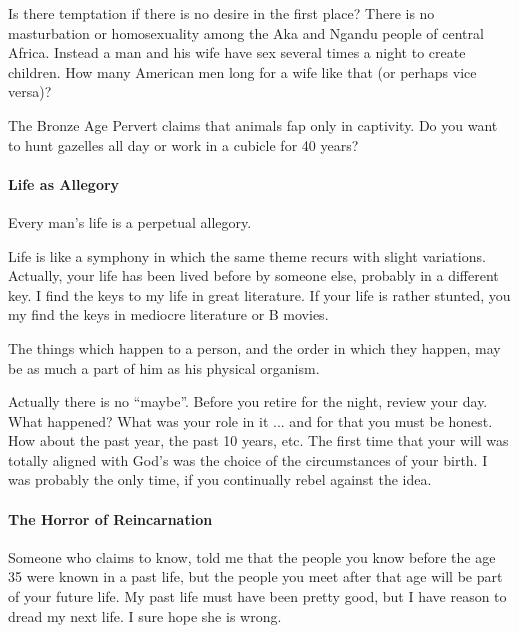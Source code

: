 Is there temptation if there is no desire in the first place? There is no masturbation or homosexuality among the Aka and Ngandu people of central Africa. Instead a man and his wife have sex several times a night to create children. How many American men long for a wife like that (or perhaps vice versa)?

The Bronze Age Pervert claims that animals fap only in captivity. Do you want to hunt gazelles all day or work in a cubicle for 40 years?

\paragraph{Life as Allegory}


\begin{quotex}
Every man's life is a perpetual allegory.
\end{quotex}


Life is like a symphony in which the same theme recurs with slight variations. Actually, your life has been lived before by someone else, probably in a different key. I find the keys to my life in great literature. If your life is rather stunted, you my find the keys in mediocre literature or B movies.

\begin{quotex}
The things which happen to a person, and the order in which they happen, may be as much a part of him as his physical organism.
\end{quotex}


Actually there is no ``maybe''. Before you retire for the night, review your day. What happened? What was your role in it ... and for that you must be honest. How about the past year, the past 10 years, etc. The first time that your will was totally aligned with God's was the choice of the circumstances of your birth. I was probably the only time, if you continually rebel against the idea.

\paragraph{The Horror of Reincarnation}


Someone who claims to know, told me that the people you know before the age 35 were known in a past life, but the people you meet after that age will be part of your future life. My past life must have been pretty good, but I have reason to dread my next life. I sure hope she is wrong.

